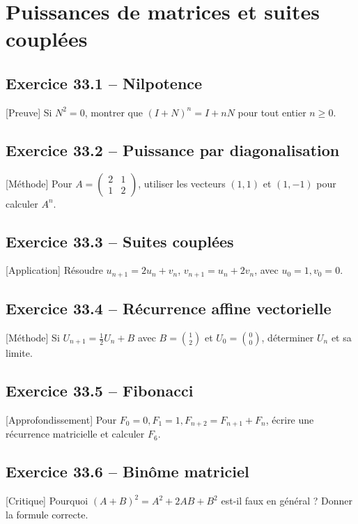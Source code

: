 \chapter{Puissances de matrices et suites couplées}
\section*{Exercice 33.1 -- Nilpotence}
[Preuve] Si $N^2=0$, montrer que $(I+N)^n=I+nN$ pour tout entier $n\ge0$.

\section*{Exercice 33.2 -- Puissance par diagonalisation}
[Méthode] Pour $A=\begin{pmatrix}2&1\\1&2\end{pmatrix}$, utiliser les vecteurs $(1,1)$ et $(1,-1)$ pour calculer $A^n$.

\section*{Exercice 33.3 -- Suites couplées}
[Application] Résoudre $u_{n+1}=2u_n+v_n$, $v_{n+1}=u_n+2v_n$, avec $u_0=1,v_0=0$.

\section*{Exercice 33.4 -- Récurrence affine vectorielle}
[Méthode] Si $U_{n+1}=\frac12U_n+B$ avec $B=\binom12$ et $U_0=\binom00$, déterminer $U_n$ et sa limite.

\section*{Exercice 33.5 -- Fibonacci}
[Approfondissement] Pour $F_0=0,F_1=1,F_{n+2}=F_{n+1}+F_n$, écrire une récurrence matricielle et calculer $F_6$.

\section*{Exercice 33.6 -- Binôme matriciel}
[Critique] Pourquoi $(A+B)^2=A^2+2AB+B^2$ est-il faux en général ? Donner la formule correcte.
